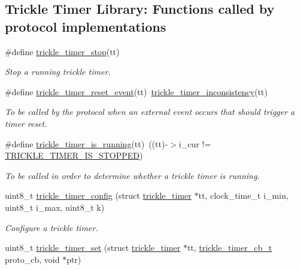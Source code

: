 \subsection*{Trickle Timer Library\+: Functions called by protocol implementations}
\begin{DoxyCompactItemize}
\item 
\#define \hyperlink{group__trickle-timer_gaa475b1b9b3edd81df04d290bd34d7e72}{trickle\+\_\+timer\+\_\+stop}(tt)
\begin{DoxyCompactList}\small\item\em Stop a running trickle timer. \end{DoxyCompactList}\item 
\#define \hyperlink{group__trickle-timer_ga3795c2533ccbd951226385e9b8f30f09}{trickle\+\_\+timer\+\_\+reset\+\_\+event}(tt)~\hyperlink{group__trickle-timer_gae401435f40030c5c4f0f49e813fd9afc}{trickle\+\_\+timer\+\_\+inconsistency}(tt)
\begin{DoxyCompactList}\small\item\em To be called by the protocol when an external event occurs that should trigger a timer reset. \end{DoxyCompactList}\item 
\#define \hyperlink{group__trickle-timer_ga584276a4a8fdcdaf58aa9406e5214591}{trickle\+\_\+timer\+\_\+is\+\_\+running}(tt)~((tt)-\/$>$i\+\_\+cur != \hyperlink{group__trickle-timer_ga46a9d1ac6e07dc96cfd6224b873333ca}{T\+R\+I\+C\+K\+L\+E\+\_\+\+T\+I\+M\+E\+R\+\_\+\+I\+S\+\_\+\+S\+T\+O\+P\+P\+E\+D})
\begin{DoxyCompactList}\small\item\em To be called in order to determine whether a trickle timer is running. \end{DoxyCompactList}\item 
uint8\+\_\+t \hyperlink{group__trickle-timer_ga4b21d9fbed3c0c903fa1687b812a7f9c}{trickle\+\_\+timer\+\_\+config} (struct \hyperlink{structtrickle__timer}{trickle\+\_\+timer} $\ast$tt, clock\+\_\+time\+\_\+t i\+\_\+min, uint8\+\_\+t i\+\_\+max, uint8\+\_\+t k)
\begin{DoxyCompactList}\small\item\em Configure a trickle timer. \end{DoxyCompactList}\item 
uint8\+\_\+t \hyperlink{group__trickle-timer_ga57b03043f109c0b2adb1dc92637ee8b4}{trickle\+\_\+timer\+\_\+set} (struct \hyperlink{structtrickle__timer}{trickle\+\_\+timer} $\ast$tt, \hyperlink{group__trickle-timer_ga243193848d28e6373682b8bd2e25850a}{trickle\+\_\+timer\+\_\+cb\+\_\+t} proto\+\_\+cb, void $\ast$ptr)

\end{DoxyCompactItemize}
